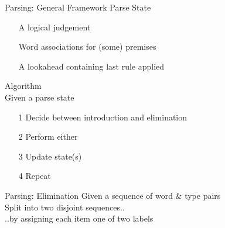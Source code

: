 \documentclass{beamer}
\begin{document}
\begin{frame}{Parsing: General Framework}
\alert{Parse State}
\begin{itemize}
	\item[] A logical judgement
	\item[] Word associations for (some) premises
	\item[] A lookahead containing last rule applied
\end{itemize}

\alert{Algorithm}\\
Given a parse state
\begin{itemize}
\item[1] Decide between introduction and elimination
\item[2] Perform either
\item[3] Update state(s)
\item[4] Repeat
\end{itemize}
\end{frame}

\begin{frame}{Parsing: Elimination}
Given a sequence of word \& type pairs \\ 
\quad Split into two disjoint sequences.. \\
\pause
\quad ..by assigning each item one of two labels
\end{frame}
\end{document}
